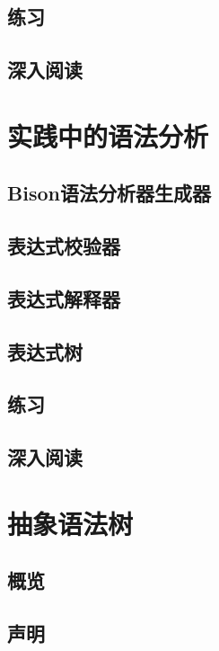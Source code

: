 \documentclass[cn,11pt,chinese]{elegantbook}
\begin{document}
\section{练习}

\section{深入阅读}

\chapter{实践中的语法分析}

\section{Bison语法分析器生成器}

\section{表达式校验器}

\section{表达式解释器}

\section{表达式树}

\section{练习}

\section{深入阅读}

\chapter{抽象语法树}

\section{概览}

\section{声明}
\end{document}
